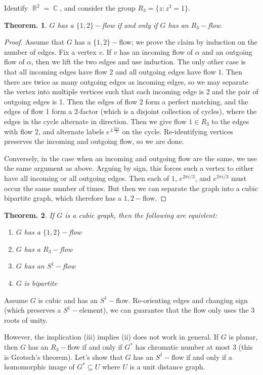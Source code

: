 \documentclass[11pt, a4paper]{memoir}
\DeclareMathOperator{\R}{{\mathbb{R}}}
\DeclareMathOperator{\C}{{\mathbb{C}}}
\theoremstyle{change}
\newtheorem{theorem}{Theorem.}[section]
\theoremstyle{plain}
\theoremstyle{nonumberplain}
\newtheorem{proof}{Proof}
\numberwithin{equation}{section}
\begin{document}
Identify $\R^2=\C$, and consider the group $R_3=\{z:z^3=1\}$.
\begin{theorem}
    $G$ has a $\{1,2\}-$flow if and only if $G$ has an $R_3-$flow.
\end{theorem}
\begin{proof}
    Assume that $G$ has a $\{1,2\}-$flow; we prove the claim by induction on the number of edges.
    Fix a vertex $v$.
    If $v$ has an incoming flow of $\alpha$ and an outgoing flow of $\alpha$, then we lift the two edges and use induction.
    The only other case is that all incoming edges have flow $2$ and all outgoing edges have flow $1$.
    Then there are twice as many outgoing edges as incoming edges, so we may separate the vertex into multiple vertices such that each incoming edge is 2 and the pair of outgoing edges is 1.
    Then the edges of flow 2 form a perfect matching, and the edges of flow 1 form a 2-factor (which is a disjoint collection of cycles), where the edges in the cycle alternate in direction.
    Then we give flow $1\in R_3$ to the edges with flow 2, and alternate labels $e^{\pm\frac{2\pi i}{3}}$ on the cycle.
    Re-identifying vertices preserves the incoming and outgoing flow, so we are done.

    Conversely, in the case when an incoming and outgoing flow are the same, we use the same argument as above.
    Arguing by sign, this forces such a vertex to either have all incoming or all outgoing edges.
    Then each of $1$, $e^{2\pi i/3}$, and $e^{2\pi i/3}$ must occur the same number of times.
    But then we can separate the graph into a cubic bipartite graph, which therefore has a $1,2-$flow.
\end{proof}
\begin{theorem}
    If $G$ is a cubic graph, then the following are equivlent:
    \begin{enumerate}[nl,r]
        \item $G$ has a $\{1,2\}-$flow
        \item $G$ has a $R_3-$flow
        \item $G$ has an $S^1-$flow
        \item $G$ is bipartite
    \end{enumerate}
\end{theorem}
Assume $G$ is cubic and has an $S^1-$flow.
Re-orienting edges and changing sign (which preserves a $S^1-$element), we can guarantee that the flow only uses the 3 roots of unity.

However, the implication (iii) implies (ii) does not work in general.
If $G$ is planar, then $G$ has an $R_3-$flow if and only if $G^*$ has chromatic number at most 3 (this is Grotsch's theorem).
Let's show that $G$ has an $S^1-$flow if and only if a homomorphic image of $G^*\subseteq U$ where $U$ is a unit distance graph.
\end{document}
